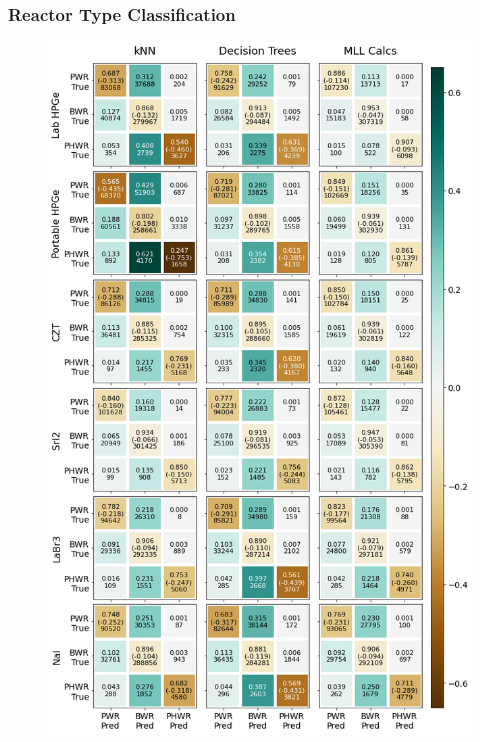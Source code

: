 \begin{frame}
  \frametitle{Reactor Type Classification}
  \begin{minipage}{0.5\textwidth}
    \begin{figure}
      \centering
      \includegraphics[height=0.88\textheight]{./figures/confusion_matrix_6dets_auto.png}
    \end{figure}
  \end{minipage}%
  \begin{minipage}{0.5\textwidth}
    \begin{figure}
      \centering

\end{figure}
\end{minipage}
\end{frame}
